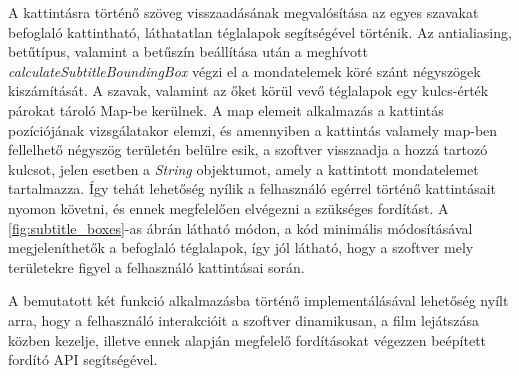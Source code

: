A kattintásra történő szöveg visszaadásának megvalósítása az egyes szavakat befoglaló kattintható, láthatatlan téglalapok segítségével történik. Az antialiasing, betűtípus, valamint a betűszín beállítása után a meghívott \textit{calculateSubtitleBoundingBox} végzi el a mondatelemek köré szánt négyszögek kiszámítását. A szavak, valamint az őket körül vevő téglalapok egy kulcs-érték párokat tároló Map-be kerülnek. A map elemeit alkalmazás a kattintás pozíciójának vizsgálatakor elemzi, és amennyiben a kattintás valamely map-ben fellelhető négyszög területén belülre esik, a szoftver visszaadja a hozzá tartozó kulcsot, jelen esetben a \textit{String} objektumot, amely a kattintott mondatelemet tartalmazza. Így tehát lehetőség nyílik a felhasználó egérrel történő kattintásait nyomon követni, és ennek megfelelően elvégezni a szükséges fordítást. A \ref{fig:subtitle_boxes}-as ábrán látható módon, a kód minimális módosításával megjeleníthetők a befoglaló téglalapok, így jól látható, hogy a szoftver mely területekre figyel a felhasználó kattintásai során.

A bemutatott két funkció alkalmazásba történő implementálásával lehetőség nyílt arra, hogy a felhasználó interakcióit a szoftver dinamikusan, a film lejátszása közben kezelje, illetve ennek alapján megfelelő fordításokat végezzen beépített fordító API segítségével.
